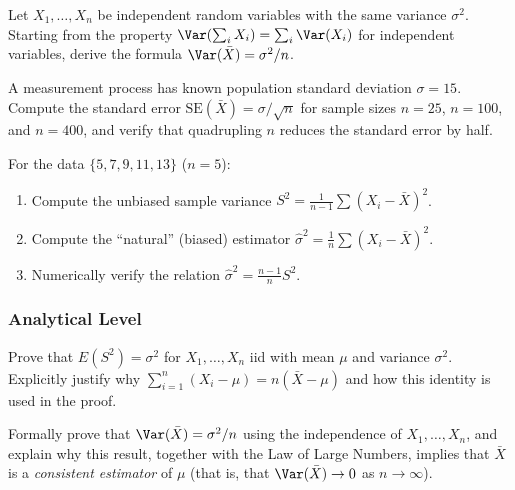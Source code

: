 \begin{problema}
	\label{prob:5.1.4}
	Let $X_{1}, \ldots, X_{n}$ be independent random variables with the same variance $\sigma^{2}$. Starting from the property $\Var(\sum_i X_i) = \sum_i \Var(X_i)$ for independent variables, derive the formula $\Var(\bar{X}) = \sigma^{2}/n$.
\end{problema}

\begin{problema}
	\label{prob:5.1.5}
	A measurement process has known population standard deviation $\sigma = 15$. Compute the standard error $\text{SE}(\bar{X}) = \sigma/\sqrt{n}$ for sample sizes $n = 25$, $n = 100$, and $n = 400$, and verify that quadrupling $n$ reduces the standard error by half.
\end{problema}

\begin{problema}
	\label{prob:5.1.6}
	For the data $\{5, 7, 9, 11, 13\}$ ($n=5$):
	\begin{enumerate}
		\item Compute the unbiased sample variance $S^{2} = \frac{1}{n-1}\sum(X_i-\bar{X})^{2}$.
		\item Compute the ``natural'' (biased) estimator $\hat{\sigma}^{2} = \frac{1}{n}\sum(X_i-\bar{X})^{2}$.
		\item Numerically verify the relation $\hat{\sigma}^{2} = \frac{n-1}{n}S^{2}$.
	\end{enumerate}
\end{problema}

\subsubsection*{Analytical Level}

\begin{problema}
	\label{prob:5.1.7}
	Prove that $E(S^{2}) = \sigma^{2}$ for $X_{1}, \ldots, X_{n}$ iid with mean $\mu$ and variance $\sigma^{2}$. Explicitly justify why $\sum_{i=1}^{n}(X_i-\mu) = n(\bar{X}-\mu)$ and how this identity is used in the proof.
\end{problema}

\begin{problema}
	\label{prob:5.1.8}
	Formally prove that $\Var(\bar{X}) = \sigma^{2}/n$ using the independence of $X_{1}, \ldots, X_{n}$, and explain why this result, together with the Law of Large Numbers, implies that $\bar{X}$ is a \emph{consistent estimator} of $\mu$ (that is, that $\Var(\bar{X}) \to 0$ as $n \to \infty$).
\end{problema}

